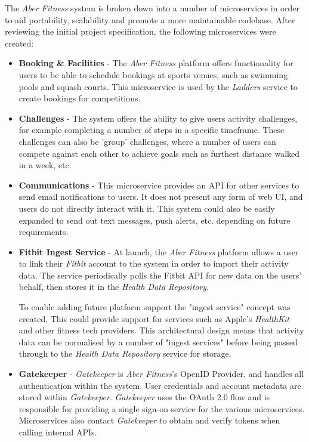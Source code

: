 The \textit{Aber Fitness} system is broken down into a number of microservices in order to aid portability, scalability and promote a more maintainable codebase. After reviewing the initial project specification, the following microservices were created:

\begin{itemize}

	\item \textbf{Booking \& Facilities} - The \textit{Aber Fitness} platform offers functionality for users to be able to schedule bookings at sports venues, such as swimming pools and squash courts. This microservice is used by the \textit{Ladders} service to create bookings for competitions.

	\item \textbf{Challenges} - The system offers the ability to give users activity challenges, for example completing a number of steps in a specific timeframe. These challenges can also be 'group' challenges, where a number of users can compete against each other to achieve goals such as furthest distance walked in a week, etc.

	\item \textbf{Communications} - This microservice provides an API for other services to send email notifications to users. It does not present any form of web UI, and users do not directly interact with it. This system could also be easily expanded to send out text messages, push alerts, etc. depending on future requirements.

	\item \textbf{Fitbit Ingest Service} - At launch, the \textit{Aber Fitness} platform allows a user to link their \textit{Fitbit} account to the system in order to import their activity data. The service periodically polls the Fitbit API for new data on the users' behalf, then stores it in the \textit{Health Data Repository}.
	
	\par To enable adding future platform support the "ingest service" concept was created. This could provide support for services such as Apple's \textit{HealthKit} and other fitness tech providers. 
	This architectural design means that activity data can be normalised by a number of "ingest services" before being passed through to the \textit{Health Data Repository} service for storage. 

	\item \textbf{Gatekeeper} - \textit{Gatekeeper} is \textit{Aber Fitness}'s OpenID Provider, and handles all authentication within the system. User credentials and account metadata are stored within \textit{Gatekeeper}. \textit{Gatekeeper} uses the OAuth 2.0 flow and is responsible for providing a single sign-on service for the various microservices. Microservices also contact \textit{Gatekeeper} to obtain and verify tokens when calling internal APIs.


\end{itemize}
